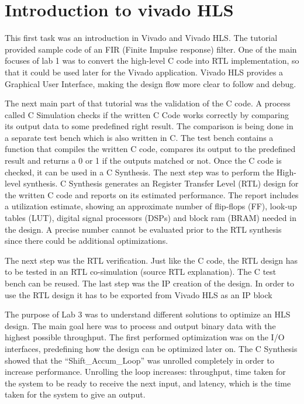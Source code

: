 \section{Introduction to vivado HLS}
This first task was an introduction in Vivado and Vivado HLS. The tutorial provided sample code of an FIR (Finite Impulse response) filter. One of the main focuses of lab 1 was to convert the high-level C code into RTL implementation, so that it could be used later for the Vivado application. Vivado HLS provides a Graphical User Interface, making the design flow more clear to follow and debug. 
 
The next main part of that tutorial was the validation of the C code. A process called C Simulation checks if the written C Code works correctly by comparing its output data to some predefined right result. The comparison is being done in a separate test bench which is also written in C. The test bench contains a function that compiles the written C code, compares its output to the predefined result and returns a 0 or 1 if the outputs matched or not. Once the C code is checked, it can be used in a C Synthesis.
The next step was to perform the High-level synthesis. C Synthesis generates an Register Transfer Level (RTL) design for the written C code and reports on its estimated performance. The report includes a utilization estimate, showing an approximate number of flip-flops (FF), look-up tables (LUT), digital signal processors (DSPs) and block ram (BRAM) needed in the design. A precise number cannot be evaluated prior to the RTL synthesis since there could be additional optimizations.

The next step was the RTL verification. Just like the C code, the RTL design has to be tested in an RTL co-simulation (source RTL explanation). The C test bench can be reused.\cite[p.25]{xilinx2018}
The last step was the IP creation of the design. In order to use the RTL design it has to be exported from Vivado HLS as an IP block 

The purpose of Lab 3 was to understand different solutions to optimize an HLS design. The main goal here was to process and output binary data with the highest possible throughput.
The first performed optimization was on the I/O interfaces, predefining how the design can be optimized later on. The C Synthesis showed that the “Shift\_Accum\_Loop” was unrolled completely in order to increase performance. Unrolling the loop increases: throughput, time taken for the system to be ready to receive the next input, and latency, which is the time taken for the system to give an output.

